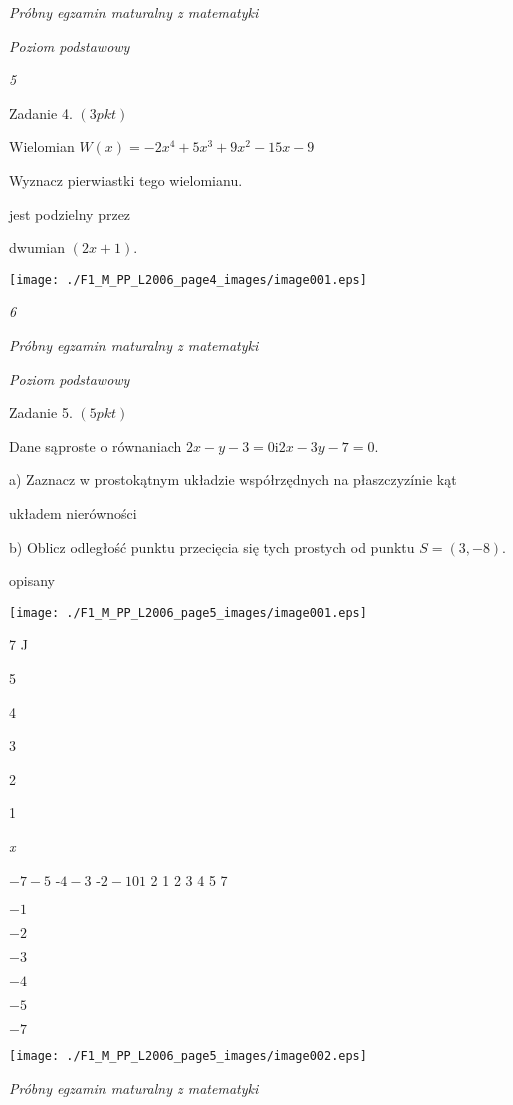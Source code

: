 \documentclass[a4paper,12pt]{article}
\begin{document}
{\it Próbny egzamin maturalny z matematyki}

{\it Poziom podstawowy}

{\it 5}

Zadanie 4. $(3pkt)$

Wielomian $W(x)=-2x^{4}+5x^{3}+9x^{2}-15x-9$

Wyznacz pierwiastki tego wielomianu.

jest podzielny przez

dwumian $(2x+1).$
\begin{center}
\texttt{[image: ./F1\_M\_PP\_L2006\_page4\_images/image001.eps]}
\end{center}




{\it 6}

{\it Próbny egzamin maturalny z matematyki}

{\it Poziom podstawowy}

Zadanie 5. $(5pkt)$

Dane sąproste o równaniach $2x-y-3=0\mathrm{i}2x-3y-7=0.$

a) Zaznacz w prostokątnym układzie współrzędnych na płaszczyzínie kąt

układem nierówności 

b) Oblicz odległość punktu przecięcia się tych prostych od punktu $S=(3,-8).$

opisany
\begin{center}
\texttt{[image: ./F1\_M\_PP\_L2006\_page5\_images/image001.eps]}
\end{center}
7 J

5

4

3

2

1

{\it x}

$-7  -5$ -$4  -3$ -$2  -1 0 1$ 2  1 2 3 4 5  7

$-1$

$-2$

$-3$

$-4$

$-5$

$-7$
\begin{center}
\texttt{[image: ./F1\_M\_PP\_L2006\_page5\_images/image002.eps]}
\end{center}




{\it Próbny egzamin maturalny z matematyki}
\end{document}
